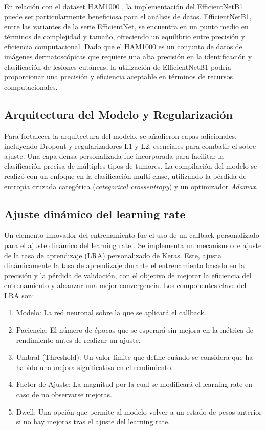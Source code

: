 En relación con el dataset HAM1000 , la implementación del EfficientNetB1 puede ser particularmente beneficiosa para el análisis de datos. EfficientNetB1, entre las variantes de la serie EfficientNet, se encuentra en un punto medio en términos de complejidad y tamaño, ofreciendo un equilibrio entre precisión y eficiencia computacional. Dado que el HAM1000 es un conjunto de datos de imágenes dermatoscópicas que requiere una alta precisión en la identificación y clasificación de lesiones cutáneas, la utilización de EfficientNetB1 podría proporcionar una precisión y eficiencia aceptable en términos de recursos computacionales.

\subsection{Arquitectura del Modelo y Regularización}

Para fortalecer la arquitectura del modelo, se añadieron capas adicionales, incluyendo Dropout y regularizadores L1 y L2, esenciales para combatir el sobre-ajuste. Una capa densa personalizada fue incorporada para facilitar la clasificación precisa de múltiples tipos de tumores. La compilación del modelo se realizó con un enfoque en la clasificación multi-clase, utilizando la pérdida de entropía cruzada categórica (\textit{categorical crossentropy}) y un optimizador \textit{Adamax}.

\subsection{Ajuste dinámico del learning rate}

Un elemento innovador del entrenamiento fue el uso de un callback personalizado para el ajuste dinámico del learning rate . Se implementa un mecanismo de ajuste de la tasa de aprendizaje (LRA) personalizado de Keras. Este, ajusta dinámicamente la tasa de aprendizaje durante el entrenamiento basado en la precisión y la pérdida de validación, con el objetivo de mejorar la eficiencia del entrenamiento y alcanzar una mejor convergencia. Los componentes clave del LRA son:

\begin{enumerate}
   \item Modelo: La red neuronal sobre la que se aplicará el callback.
   \item Paciencia: El número de épocas que se esperará sin mejora en la métrica de rendimiento antes de realizar un ajuste.
   \item Umbral (Threshold): Un valor límite que define cuándo se considera que ha habido una mejora significativa en el rendimiento.
   \item Factor de Ajuste: La magnitud por la cual se modificará el learning rate en caso de no observarse mejoras.
   \item Dwell: Una opción que permite al modelo volver a un estado de pesos anterior si no hay mejoras tras el ajuste del learning rate.
\end{enumerate}

